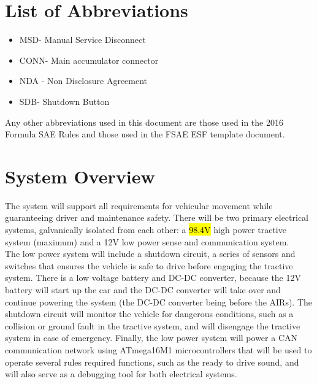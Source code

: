 \documentclass{article}
\DeclareRobustCommand{\hlr}[1]{{\sethlcolor{red}\hl{#1}}}
\begin{document}
\tableofcontents
{}

\newpage
\listoffigures
{}

\newpage
\listoftables
{}

\newpage
\section*{List of Abbreviations}
\begin{itemize}
    \item MSD- Manual Service Disconnect
    \item CONN- Main accumulator connector
    \item NDA - Non Disclosure Agreement
    \item SDB- Shutdown Button
\end{itemize}


    Any other abbreviations used in this document are those used in the 2016 Formula SAE Rules and those used in the FSAE ESF template document.

\setlength{\parindent}{0pt}

\newpage
{}


\section{System Overview} %

    The system will support all requirements for vehicular movement while guaranteeing driver and maintenance safety. There will be two primary electrical systems, galvanically isolated from each other: a \hlr{98.4V} high power tractive system (maximum) and a 12V low power sense and communication system.\\

    The low power system will include a shutdown circuit, a series of sensors and switches that ensures the vehicle is safe to drive before engaging the tractive system. There is a low voltage battery and DC-DC converter, because the 12V battery will start up the car and the DC-DC converter will take over and continue powering the system (the DC-DC converter being before the AIRs). The shutdown circuit will monitor the vehicle for dangerous conditions, such as a collision or ground fault in the tractive system, and will disengage the tractive system in case of emergency. Finally, the low power system will power a CAN communication network using ATmega16M1 microcontrollers that will be used to operate several rules required functions, such as the ready to drive sound, and will also serve as a debugging tool for both electrical systems.\\
\end{document}
